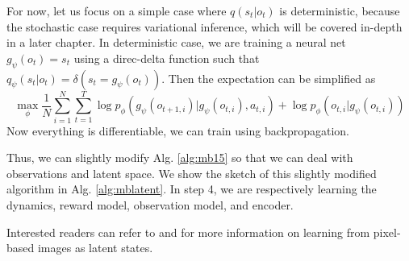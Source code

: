 For now, let us focus on a simple case where $q(s_t|o_t)$ is deterministic, because the stochastic case requires variational inference, which will be covered in-depth in a later chapter. In deterministic case, we are training a neural net $g_\psi(o_t) = s_t$ using a direc-delta function such that $q_\psi(s_t|o_t) = \delta(s_t = g_\psi(o_t))$. Then the expectation can be simplified as
\[
\max_\phi \frac{1}{N}\sum_{i=1}^N\sum_{t=1}^T\log p_\phi(g_\psi(o_{t+1,i})|g_\psi(o_{t,i}),a_{t,i}) + \log p_\phi(o_{t,i}|g_\psi(o_{t,i}))
\]
Now everything is differentiable, we can train using backpropagation. 

Thus, we can slightly modify Alg. \ref{alg:mb15} so that we can deal with observations and latent space. We show the sketch of this slightly modified algorithm in Alg. \ref{alg:mblatent}. In step 4, we are respectively learning the dynamics, reward model, observation model, and encoder.


Interested readers can refer to \cite{watter2015embed} and \cite{zhang2018solar} for more information on learning from pixel-based images as latent states.